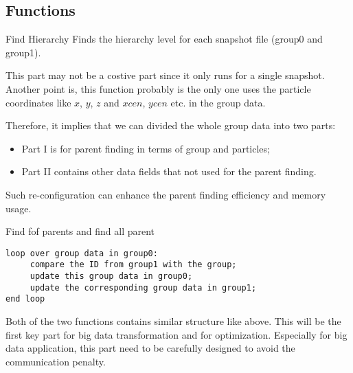 \documentclass[notheorems, aspectratio=54]{beamer}
\begin{document}
\subsection{Functions}
\begin{frame}[fragile]

\begin{block}{Find Hierarchy}
 Finds the hierarchy level for each snapshot file (group0 and group1). 
\end{block}
This part may not be a costive part since it only runs for a single snapshot. Another point is, this function probably
is the only one uses the particle coordinates like $x$, $y$, $z$ and $xcen$, $ycen$ etc. in the group data.

Therefore, it implies that we can divided the whole group data into two parts:
\begin{itemize}
 \item Part I is for parent finding in terms of group and particles;
 \item Part II contains other data fields that not used for the parent finding. 
\end{itemize}
Such re-configuration can enhance the parent finding efficiency and memory usage.


\end{frame}

\begin{frame}[fragile]

\begin{block}{Find fof parents and find all parent}
 \begin{verbatim}
loop over group data in group0:
     compare the ID from group1 with the group;
     update this group data in group0;
     update the corresponding group data in group1;
end loop
 \end{verbatim}
\end{block}
Both of the two functions contains similar structure like above. This will be the first key part for big data transformation
and for optimization. Especially for big data application, this part need to be carefully designed to avoid the communication 
penalty.

\end{frame}
\end{document}
